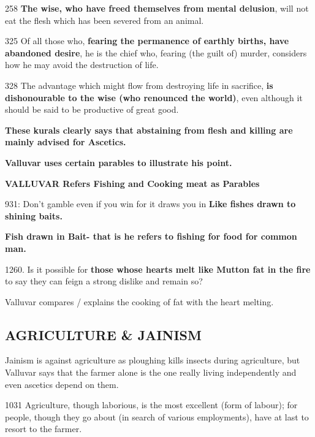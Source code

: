 258 \textbf{The wise, who have freed themselves from mental delusion}, will not eat the flesh which has been severed from an animal.

 325 Of all those who, \textbf{fearing the permanence of earthly births, have abandoned desire}, he is the chief who, fearing (the guilt of) murder, considers how he may avoid the destruction of life.

328 The advantage which might flow from destroying life in sacrifice, \textbf{is dishonourable to the wise (who renounced the world)}, even although it should be said to be productive of great good.

\textbf{These kurals clearly says that abstaining from flesh and killing are mainly advised for Ascetics.}

\textbf{Valluvar uses certain parables to illustrate his point.}

\textbf{VALLUVAR Refers Fishing and Cooking meat as Parables}

931: Don’t gamble even if you win for it draws you in \textbf{Like fishes drawn to shining baits.}

\textbf{Fish drawn in Bait- that is he refers to fishing for food for common man.}

1260. Is it possible for \textbf{those whose hearts melt like Mutton fat in the fire} to say they can feign a strong dislike and remain so?

Valluvar compares / explains the cooking of fat with the heart melting.


\subsection*{AGRICULTURE \& JAINISM}

Jainism is against agriculture as ploughing kills insects during agriculture, but Valluvar says that the farmer alone is the one really living independently and even ascetics depend on them.

1031 Agriculture, though laborious, is the most excellent (form of labour); for people, though they go about (in search of various employments), have at last to resort to the farmer.

